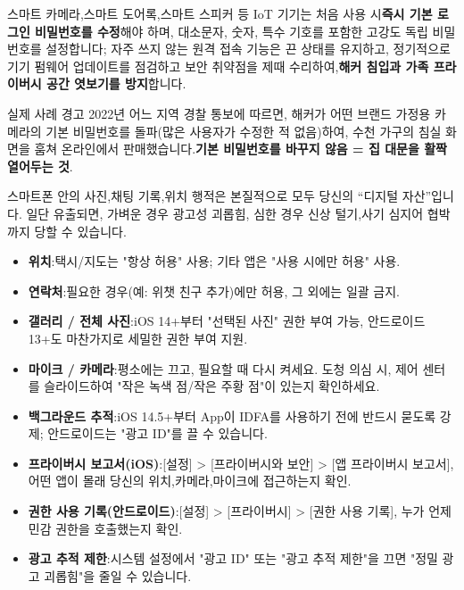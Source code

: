 
스마트 카메라,스마트 도어록,스마트 스피커 등 IoT 기기는 처음 사용 시\textbf{즉시 기본 로그인 비밀번호를 수정}해야 하며, 대소문자, 숫자, 특수 기호를 포함한 고강도 독립 비밀번호를 설정합니다; 자주 쓰지 않는 원격 접속 기능은 끈 상태를 유지하고, 정기적으로 기기 펌웨어 업데이트를 점검하고 보안 취약점을 제때 수리하여,\textbf{해커 침입과 가족 프라이버시 공간 엿보기를 방지}합니다.

\begin{tcbwarn}{실제 사례 경고}
2022년 어느 지역 경찰 통보에 따르면, 해커가 어떤 브랜드 가정용 카메라의 기본 비밀번호를 돌파(많은 사용자가 수정한 적 없음)하여, 수천 가구의 침실 화면을 훔쳐 온라인에서 판매했습니다.\textbf{기본 비밀번호를 바꾸지 않음 = 집 대문을 활짝 열어두는 것}.

\end{tcbwarn}


스마트폰 안의 사진,채팅 기록,위치 행적은 본질적으로 모두 당신의 “디지털 자산”입니다. 일단 유출되면, 가벼운 경우 광고성 괴롭힘, 심한 경우 신상 털기,사기 심지어 협박까지 당할 수 있습니다.


\begin{itemize}
  \item \textbf{위치}:택시/지도는 "항상 허용" 사용; 기타 앱은 "사용 시에만 허용" 사용.
  \item \textbf{연락처}:필요한 경우(예: 위챗 친구 추가)에만 허용, 그 외에는 일괄 금지.
  \item \textbf{갤러리 / 전체 사진}:iOS 14+부터 "선택된 사진" 권한 부여 가능, 안드로이드 13+도 마찬가지로 세밀한 권한 부여 지원.
  \item \textbf{마이크 / 카메라}:평소에는 끄고, 필요할 때 다시 켜세요. 도청 의심 시, 제어 센터를 슬라이드하여 "작은 녹색 점/작은 주황 점"이 있는지 확인하세요.
  \item \textbf{백그라운드 추적}:iOS 14.5+부터 App이 IDFA를 사용하기 전에 반드시 묻도록 강제; 안드로이드는 "광고 ID"를 끌 수 있습니다.
\end{itemize}


\begin{itemize}
  \item \textbf{프라이버시 보고서(iOS)}:[설정] > [프라이버시와 보안] > [앱 프라이버시 보고서], 어떤 앱이 몰래 당신의 위치,카메라,마이크에 접근하는지 확인.
  \item \textbf{권한 사용 기록(안드로이드)}:[설정] > [프라이버시] > [권한 사용 기록], 누가 언제 민감 권한을 호출했는지 확인.
  \item \textbf{광고 추적 제한}:시스템 설정에서 "광고 ID" 또는 "광고 추적 제한"을 끄면 "정밀 광고 괴롭힘"을 줄일 수 있습니다.
\end{itemize}

